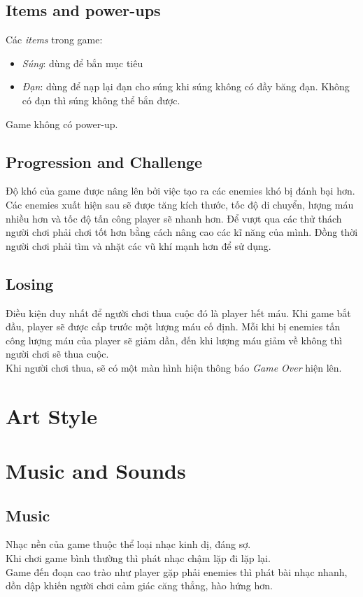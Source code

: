 \documentclass[14pt,a4paper]{extreport}
\begin{document}
\section{Items and power-ups}
Các \textit{items} trong game: 
\begin{itemize}
	\item \textit{Súng}: dùng để bắn mục tiêu
	\item \textit{Đạn}: dùng để nạp lại đạn cho súng khi súng không có đầy băng đạn. Không có đạn thì súng không thể bắn được.

\end{itemize}

Game không có power-up.

\section{Progression and Challenge}
Độ khó của game được nâng lên bởi việc tạo ra các enemies khó bị đánh bại hơn. Các enemies xuất hiện sau sẽ được tăng kích thước, tốc độ di chuyển, lượng máu nhiều hơn và tốc độ tấn công player sẽ nhanh hơn. Để vượt qua các thử thách người chơi phải chơi tốt hơn bằng cách nâng cao các kĩ năng của mình. Đồng thời người chơi phải tìm và nhặt các vũ khí mạnh hơn để sử dụng.


\section{Losing}
Điều kiện duy nhất để người chơi thua cuộc đó là player hết máu. Khi game bắt đầu, player sẽ được cấp trước một lượng máu cố định. Mỗi khi bị enemies tấn công lượng máu của player sẽ giảm dần, đến khi lượng máu giảm về không thì người chơi sẽ thua cuộc. \\
Khi người chơi thua, sẽ có một màn hình hiện thông báo \textit{Game Over} hiện lên.

\chapter{Art Style}



\chapter{Music and Sounds}
\section{Music}
Nhạc nền của game thuộc thể loại nhạc kinh dị, đáng sợ. \\
Khi chơi game bình thường thì phát nhạc chậm lặp đi lặp lại. \\
Game đến đoạn cao trào như player gặp phải enemies thì phát bài nhạc nhanh, dồn dập khiến người chơi cảm giác căng thẳng, hào hứng hơn.
\end{document}
